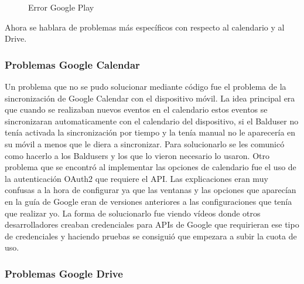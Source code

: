 \begin{figure}[H] 
  \begin{center} 
    \caption{Error Google Play} 
    \label{fig:ErrorGoogle} 
  \end{center} 
\end{figure}

Ahora se hablara de problemas más específicos con respecto al calendario y al Drive.

\subsubsection{Problemas Google Calendar}
\label{subsubsecc:Problemas Google Calendar}

Un problema que no se pudo solucionar mediante código fue el problema de la sincronización de Google Calendar con el dispositivo móvil. La idea principal era que cuando se realizaban nuevos eventos en el calendario estos eventos se sincronizaran automaticamente con el calendario del dispositivo, si el Balduser no tenía activada la sincronización por tiempo y la tenía manual no le aparecería en su móvil a menos que le diera a sincronizar.
Para solucionarlo se les comunicó como hacerlo a los Baldusers y los que lo vieron necesario lo usaron.
Otro problema que se encontró al implementar las opciones de calendario fue el uso de la autenticación OAuth2 \cite{Oauth} que requiere el API.
Las explicaciones eran muy confusas a la hora de configurar ya que las ventanas y las opciones que aparecían en la guía de Google eran de versiones anteriores a las configuraciones que tenía que realizar yo.
La forma de solucionarlo fue viendo vídeos donde otros desarrolladores creaban credenciales para APIs de Google que requirieran ese tipo de credenciales y haciendo pruebas se consiguió que empezara a subir la cuota de uso.


\subsubsection{Problemas Google Drive}
\label{subsubsecc:Problemas Google Drive}

